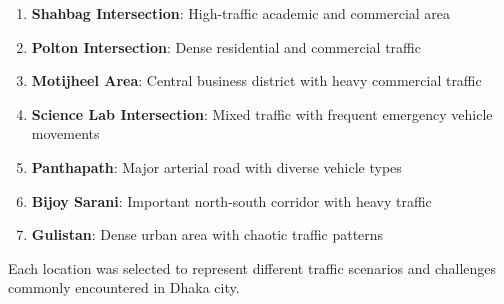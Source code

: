 \begin{enumerate}
    \item \textbf{Shahbag Intersection}: High-traffic academic and commercial area
    \item \textbf{Polton Intersection}: Dense residential and commercial traffic
    \item \textbf{Motijheel Area}: Central business district with heavy commercial traffic
    \item \textbf{Science Lab Intersection}: Mixed traffic with frequent emergency vehicle movements
    \item \textbf{Panthapath}: Major arterial road with diverse vehicle types
    \item \textbf{Bijoy Sarani}: Important north-south corridor with heavy traffic
    \item \textbf{Gulistan}: Dense urban area with chaotic traffic patterns
\end{enumerate}

Each location was selected to represent different traffic scenarios and challenges commonly encountered in Dhaka city.

